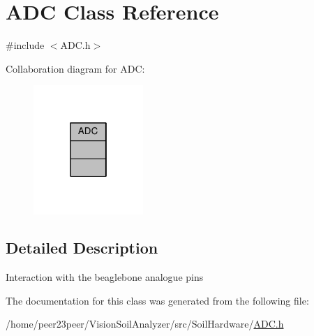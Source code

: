 \hypertarget{class_a_d_c}{}\section{A\+D\+C Class Reference}
\label{class_a_d_c}


{\ttfamily \#include $<$A\+D\+C.\+h$>$}



Collaboration diagram for A\+D\+C\+:\nopagebreak
\begin{figure}[H]
\begin{center}
\leavevmode
\includegraphics[width=118pt]{class_a_d_c__coll__graph}
\end{center}
\end{figure}


\subsection{Detailed Description}
Interaction with the beaglebone analogue pins 

The documentation for this class was generated from the following file\+:\begin{DoxyCompactItemize}
\item 
/home/peer23peer/\+Vision\+Soil\+Analyzer/src/\+Soil\+Hardware/\hyperlink{_a_d_c_8h}{A\+D\+C.\+h}\end{DoxyCompactItemize}
